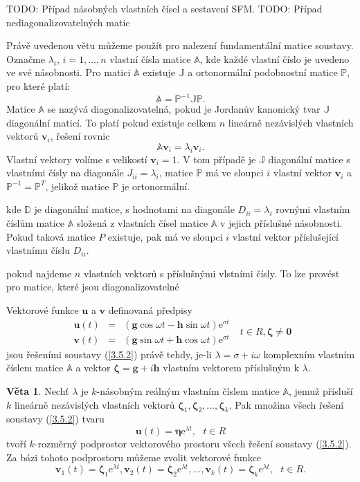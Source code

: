 \documentclass[a4paper, 12pt]{book}
\theoremstyle{definition}
\newtheorem{theorem}{Věta}[section]
\def\vc#1{\mathbf{\boldsymbol{#1}}}     %
\def\tn#1{{\mathbb{#1}}}    %
\def\todo#1{{\color{green}TODO:} #1}
\begin{document}
\todo{Případ násobných vlastních čísel a sestavení SFM.}
\todo{Případ nediagonalizovatelných matic}

Právě uvedenou větu můžeme použít pro nalezení fundamentální matice soustavy. Označme $\lambda_i$, $i=1,\dots, n$ vlastní čísla
matice $\tn A$, kde každé vlastní číslo je uvedeno ve své násobnosti. Pro matici $\tn A$ existuje  $\tn J$
a ortonormální podobnostní matice $\tn P$, pro které platí:
\[
   \tn A = \tn P^{-1} \tn J \tn P.
\]
Matice $\tn A$ se nazývá diagonalizovatelná, pokud je Jordanův kanonický tvar $\tn J$ diagonální maticí. To platí pokud 
existuje celkem $n$ lineárně nezávislých vlastních vektorů $\vc v_i$, řešení rovnic
\[
   \tn A \vc v_i = \lambda_i \vc v_i.
\]
Vlastní vektory volíme s velikostí $\vc v_i = 1$.
V tom případě je $\tn J$ diagonální matice s vlastními čísly na diagonále $J_{ii} =\lambda_i$, 
matice $\tn P$ má ve sloupci $i$ vlastní vektor $\vc v_i$ a $\tn P^{-1} = \tn P^T$, jelikož matice $\tn P$ je ortonormální.



kde $\tn D$ je diagonální matice, s hodnotami na diagonále $D_{ii} = \lambda_i$ rovnými vlastním číslům matice $\tn A$ složená z vlastních čísel matice $\tn A$ v jejich příslušné násobnosti.
Pokud taková matice $P$ existuje, pak má ve sloupci $i$ vlastní vektor příslušející vlastnímu číslu $D_{ii}$.

pokud najdeme 
$n$ vlastních vektorů s příslušnými vlstními čísly. To lze provést pro matice, které jsou diagonalizovatelné


Vektorové funkce $\vc u$ a $\vc v$ definovaná předpisy
\begin{equation}
\begin{array}{rcl}
\vc u(t)&=&(\vc g\cos\omega t - \vc h\sin\omega t)\mathrm{e}^{\sigma t}\\
\vc v(t)&=&(\vc g\sin\omega t + \vc h\cos\omega t)\mathrm{e}^{\sigma t}
\end{array}
~~~t\in R, \vc\zeta\neq\vc 0
\end{equation}
jsou řešeními soustavy (\ref{3.5.2}) právě tehdy, je-li $\lambda=\sigma + i\omega$ 
komplexním vlastním číslem matice $\tn A$ a vektor $\vc\zeta=\vc g+i \vc h$ 
vlastním vektorem příslušným k $\lambda$.

\begin{theorem}
Nechť $\lambda$ je $k$-násobným reálným vlastním číslem matice $\tn A$, jemuž 
přísluší $k$ lineárně nezávislých vlastních vektorů $\vc\zeta_1, \vc\zeta_2, 
\dots,\vc\zeta_k$. Pak množina všech řešení soustavy (\ref{3.5.2}) tvaru
\begin{equation}
\vc u(t)=\vc\eta\mathrm{e}^{\lambda t},~~~t\in R
\end{equation}
tvoří $k$-rozměrný podprostor vektorového prostoru všech řešení soustavy 
(\ref{3.5.2}). Za bázi tohoto podprostoru můžeme zvolit vektorové funkce 
\begin{equation}
\vc v_1(t)=\vc\zeta_1\mathrm{e}^{\lambda t},
\vc v_2(t)=\vc\zeta_2\mathrm{e}^{\lambda t},
\dots,
\vc v_k(t)=\vc\zeta_k\mathrm{e}^{\lambda t},~~~t\in R.
\end{equation}
\end{theorem}
\end{document}
